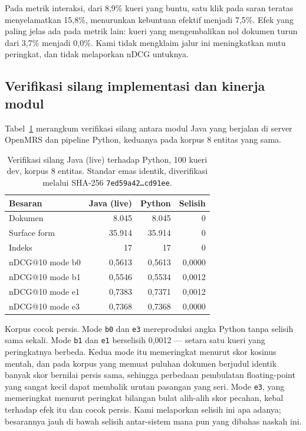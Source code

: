 \documentclass[journal,twoside,web]{ieeecolor}
\begin{document}
Pada metrik interaksi, dari 8,9\% kueri yang buntu, satu klik pada saran teratas
menyelamatkan 15,8\%, menurunkan kebuntuan efektif menjadi 7,5\%. Efek yang
paling jelas ada pada metrik lain: kueri yang mengembalikan nol dokumen turun
dari 3,7\% menjadi 0,0\%. Kami tidak mengklaim jalur ini meningkatkan mutu
peringkat, dan tidak melaporkan nDCG untuknya.

\subsection{Verifikasi silang implementasi dan kinerja modul}

Tabel~\ref{tab:verifikasi} merangkum verifikasi silang antara modul Java yang
berjalan di server OpenMRS dan pipeline Python, keduanya pada korpus 8 entitas
yang sama.

\begin{table}[!t]
\caption{Verifikasi silang Java (live) terhadap Python, 100 kueri dev, korpus 8
entitas. Standar emas identik, diverifikasi melalui SHA-256
\texttt{7ed59a42\dots cd91ee}.}
\label{tab:verifikasi}
\centering
\footnotesize
\setlength{\tabcolsep}{5pt}
\begin{tabular}{@{}lrrr@{}}
\toprule
\textbf{Besaran} & \textbf{Java (live)} & \textbf{Python} & \textbf{Selisih} \\
\midrule
Dokumen           & 8.045 & 8.045 & 0 \\
Surface form      & 35.914 & 35.914 & 0 \\
Indeks            & 17 & 17 & 0 \\
\midrule
nDCG@10 mode b0   & 0,5613 & 0,5613 & 0,0000 \\
nDCG@10 mode b1   & 0,5546 & 0,5534 & 0,0012 \\
nDCG@10 mode e1   & 0,7383 & 0,7371 & 0,0012 \\
nDCG@10 mode e3   & 0,7368 & 0,7368 & 0,0000 \\
\bottomrule
\end{tabular}
\end{table}

Korpus cocok persis. Mode \texttt{b0} dan \texttt{e3} mereproduksi angka Python
tanpa selisih sama sekali. Mode \texttt{b1} dan \texttt{e1} berselisih 0,0012 ---
setara satu kueri yang peringkatnya berbeda. Kedua mode itu memeringkat menurut
skor kosinus mentah, dan pada korpus yang memuat puluhan dokumen berjudul identik
banyak skor bernilai persis sama, sehingga perbedaan pembulatan floating-point
yang sangat kecil dapat membalik urutan pasangan yang seri. Mode \texttt{e3},
yang memeringkat menurut peringkat bilangan bulat alih-alih skor pecahan, kebal
terhadap efek itu dan cocok persis. Kami melaporkan selisih ini apa adanya;
besarannya jauh di bawah selisih antar-sistem mana pun yang dibahas naskah ini.
\end{document}
